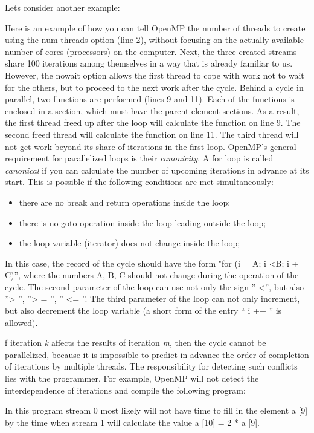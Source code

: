 {	\par Lets consider another example: 
	\begin{figure}[H]
		
	\end{figure}
	\par Here is an example of how you can tell OpenMP the number of threads to create using the num \textunderscore threads option (line 2), without focusing on the actually available number of cores (processors) on the computer. Next, the three created streams share 100 iterations among themselves in a way that is already familiar to us. However, the nowait option allows the first thread to cope with work not to wait for the others, but to proceed to the next work after the cycle. Behind a cycle in parallel, two functions are performed (lines 9 and 11). Each of the functions is enclosed in a section, which must have the parent element sections. As a result, the first thread freed up after the loop will calculate the function on line 9. The second freed thread will calculate the function on line 11. The third thread will not get work beyond its share of iterations in the first loop.
OpenMP's general requirement for parallelized loops is their \textit {canonicity}. A for loop is called \textit {canonical} if you can calculate the number of upcoming iterations in advance at its start. This is possible if the following conditions are met simultaneously:
	\begin{itemize}
		\item there are no break and return operations inside the loop;
		\item there is no goto operation inside the loop leading outside the loop;
		\item the loop variable (iterator) does not change inside the loop;
	\end{itemize}
In this case, the record of the cycle should have the form "for (i = A; i <B; i + = C)'', where the numbers A, B, C should not change during the operation of the cycle. The second parameter of the loop can use not only the sign '' <'', but also ''> '', ''> = '', '' <= ''. The third parameter of the loop can not only increment, but also decrement the loop variable (a short form of the entry `` i ++ '' is allowed).
	\par f iteration \textit{k} affects the results of iteration \textit{m}, then the cycle cannot be parallelized, because it is impossible to predict in advance the order of completion of iterations by multiple threads. The responsibility for detecting such conflicts lies with the programmer. For example, OpenMP will not detect the interdependence of iterations and compile the following program:
	\begin{figure}[H]
		
	\end{figure}
	\par In this program stream 0 most likely will not have time to fill in the element a [9] by the time when stream 1 will calculate the value a [10] = 2 * a [9].
	\par
}